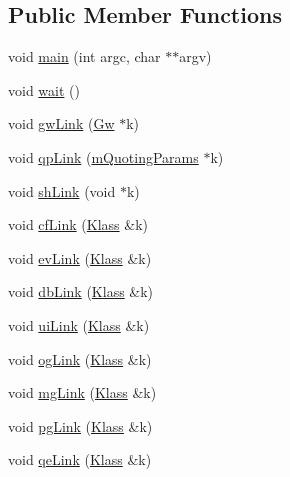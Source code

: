 \subsection*{Public Member Functions}
\begin{DoxyCompactItemize}
\item 
void \hyperlink{class_k_1_1_klass_a70db8bd1d499619f7ff9c1ca2ff3c8df}{main} (int argc, char $\ast$$\ast$argv)
\item 
void \hyperlink{class_k_1_1_klass_aa3b21853f890838c88d047d6c2786917}{wait} ()
\item 
void \hyperlink{class_k_1_1_klass_ae5e4326dac127aa27fb0456657a9f49c}{gw\+Link} (\hyperlink{class_k_1_1_gw}{Gw} $\ast$k)
\item 
void \hyperlink{class_k_1_1_klass_a2d610572e6c73a1b702ada2e878a947c}{qp\+Link} (\hyperlink{struct_k_1_1m_quoting_params}{m\+Quoting\+Params} $\ast$k)
\item 
void \hyperlink{class_k_1_1_klass_a39b2f3998c689b256683fd17a651064b}{sh\+Link} (void $\ast$k)
\item 
void \hyperlink{class_k_1_1_klass_ad41a4f32fb16b477ff5bd12ed6e832fa}{cf\+Link} (\hyperlink{class_k_1_1_klass}{Klass} \&k)
\item 
void \hyperlink{class_k_1_1_klass_a07cc2e2fb5c51342a2488d3011d08898}{ev\+Link} (\hyperlink{class_k_1_1_klass}{Klass} \&k)
\item 
void \hyperlink{class_k_1_1_klass_ab0f3d3683bdcb890246728071d683b15}{db\+Link} (\hyperlink{class_k_1_1_klass}{Klass} \&k)
\item 
void \hyperlink{class_k_1_1_klass_aabe268d262e8fbb2210944cbfbb04fb6}{ui\+Link} (\hyperlink{class_k_1_1_klass}{Klass} \&k)
\item 
void \hyperlink{class_k_1_1_klass_ab0a07660f3119715c50624b502227de0}{og\+Link} (\hyperlink{class_k_1_1_klass}{Klass} \&k)
\item 
void \hyperlink{class_k_1_1_klass_a2dbe67fd13e13f6f65f66609b74870d9}{mg\+Link} (\hyperlink{class_k_1_1_klass}{Klass} \&k)
\item 
void \hyperlink{class_k_1_1_klass_a94f13606ea1cae0d00b5d7dce2feda38}{pg\+Link} (\hyperlink{class_k_1_1_klass}{Klass} \&k)
\item 
void \hyperlink{class_k_1_1_klass_a407bab1bd4f3c1511ab8d8f97d7dc78e}{qe\+Link} (\hyperlink{class_k_1_1_klass}{Klass} \&k)
\end{DoxyCompactItemize}

